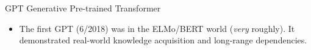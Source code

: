 \documentclass[t,aspectratio=169]{beamer}
\begin{document}
\begin{frame}{GPT}
  Generative Pre-trained Transformer

  \begin{itemize}
  \item The first GPT (6/2018) was in the ELMo/BERT world (\textit{very}
    roughly).  It demonstrated real-world knowledge acquisition and
    long-range dependencies.
  \end{itemize}
\end{frame}


\begin{frame}
\end{frame}
\end{document}
